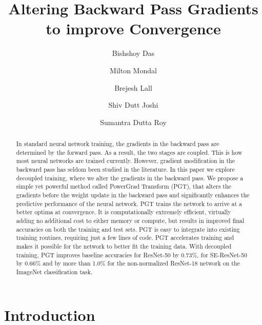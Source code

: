 \documentclass[runningheads]{llncs}
\begin{document}
\title{Altering Backward Pass Gradients to improve Convergence}
\author{Bishshoy Das\and Milton Mondal\and Brejesh Lall\and Shiv Dutt Joshi\and Sumantra Dutta Roy}
\maketitle

\begin{abstract}
In standard neural network training, the gradients in the backward pass are determined
by the forward pass. As a result, the two stages are coupled. This is how most neural
networks are trained currently. However, gradient modification in the backward pass has
seldom been studied in the literature. In this paper we explore decoupled training,
where we alter the gradients in the backward pass. We propose a simple yet powerful
method called PowerGrad Transform (PGT), that alters the gradients before the weight
update in the backward pass and significantly enhances the predictive performance of the
neural network. PGT trains the network to arrive at a better optima at convergence. It
is computationally extremely efficient, virtually adding no additional cost to either
memory or compute, but results in improved final accuracies on both the training and
test sets. PGT is easy to integrate into existing training routines, requiring just a
few lines of code. PGT accelerates training and makes it possible for the network to
better fit the training data. With decoupled training, PGT improves baseline accuracies
for ResNet-50 by 0.73\%, for SE-ResNet-50 by 0.66\% and by more than 1.0\% for the
non-normalized ResNet-18 network on the ImageNet classification task.
\end{abstract}

\section{Introduction}
\label{sec:Intr}
\end{document}
